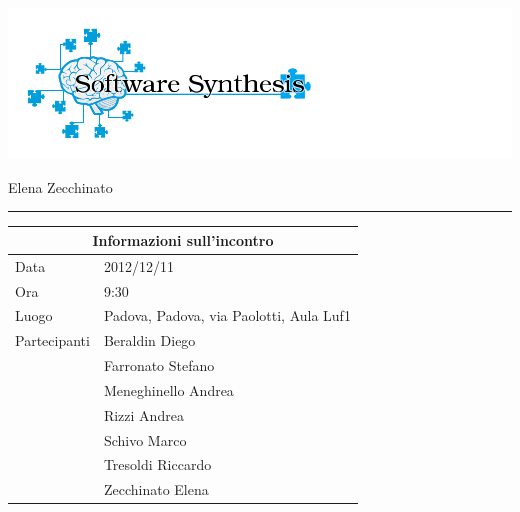 \documentclass[a4paper,10pt,openright]{article}
\begin{document}
\includegraphics[width=1.5\textwidth]{logo}

\begin{center}

\begin{Large}
\hspace{1.1cm}{Verbale d'incontro 2012/12/11}
\newline
\end{Large}

\begin{small}
Elena Zecchinato
\end{small}

\noindent\rule{\textwidth}{0.4pt}
\newline

\begin{tabular}{ll}
\toprule
\multicolumn{2}{c}{\sffamily Informazioni sull'incontro}\\
\midrule
Data & 2012/12/11 \\
Ora & 9:30 \\
Luogo & Padova, Padova, via Paolotti, Aula Luf1 \\
Partecipanti & Beraldin Diego \\ & Farronato Stefano \\ & Meneghinello Andrea \\ & Rizzi Andrea \\ & Schivo Marco \\ & Tresoldi Riccardo \\ & Zecchinato Elena\\
\bottomrule
\end{tabular}

\end{center}
\end{document}
